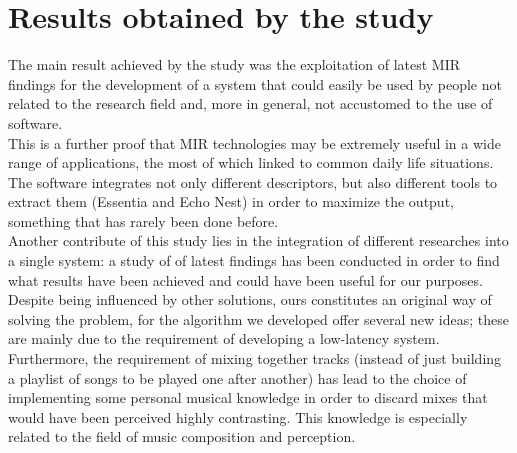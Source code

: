 \section{Results obtained by the study}
The main result achieved by the study was the exploitation of latest MIR findings for the development of a system that could easily be used by people not related to the research field and, more in general, not accustomed to the use of software. \\
This is a further proof that MIR technologies may be extremely useful in a wide range of applications, the most of which linked to common daily life situations. The software integrates not only different descriptors, but also different tools to extract them (Essentia and Echo Nest) in order to maximize the output, something that has rarely been done before.\\
Another contribute of this study lies in the integration of different researches into a single system: a study of of latest findings has been conducted in order to find what results have been achieved and could have been useful for our purposes. Despite being influenced by other solutions, ours constitutes an original way of solving the problem, for the algorithm we developed offer several new ideas; these are mainly due to the requirement of developing a low-latency system. Furthermore, the requirement of mixing together tracks (instead of just building a playlist of songs to be played one after another) has lead to the choice of implementing some personal musical knowledge in order to discard mixes that would have been perceived highly contrasting. This knowledge is especially related to the field of music composition and perception.\\

